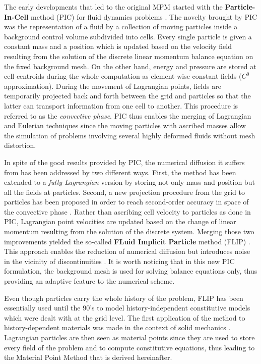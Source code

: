 The early developments that led to the original MPM started with the \textbf{Particle-In-Cell} method (PIC) for fluid dynamics problems \cite{PIC}.
The novelty brought by PIC was the representation of a fluid by a collection of moving particles inside a background control volume subdivided into cells.
Every single particle is given a constant mass and a position which is updated based on the velocity field resulting from the solution of the discrete linear momentum balance equation on the fixed background mesh. On the other hand, energy and pressure are stored at cell centroids during the whole computation as element-wise constant fields ($C^0$ approximation). 
During the movement of Lagrangian points, fields are temporarily projected back and forth between the grid and particles so that the latter can transport information from one cell to another.
This procedure is referred to as the \textit{convective phase}.
PIC thus enables the merging of Lagrangian and Eulerian techniques since the moving particles with ascribed masses allow the simulation of problems involving several highly deformed fluids without mesh distortion.

In spite of the good results provided by PIC, the numerical diffusion it suffers from has been addressed by two different ways.
First, the method has been extended to a \textit{fully Lagrangian} version \cite{McCrory_FLIP} by storing not only mass and position but all the fields at particles.
Second, a new projection procedure from the grid to particles has been proposed in order to reach second-order accuracy in space of the convective phase \cite{PIC_Nishiguchi}. 
Rather than ascribing cell velocity to particles as done in PIC, Lagrangian point velocities are updated based on the change of linear momentum resulting from the solution of the discrete system. 
Merging those two improvements yielded the so-called \textbf{FLuid Implicit Particle} method (FLIP) \cite{FLIP}.
This approach enables the reduction of numerical diffusion but introduces noise in the vicinity of discontinuities \cite{Mass_Flip}.
It is worth noticing that in this new PIC formulation, the background mesh is used for solving balance equations only, thus providing an adaptive feature to the numerical scheme. 


Even though particles carry the whole history of the problem, FLIP has been essentially used until the 90's to model history-independent constitutive models which were dealt with at the grid level. The first application of the method to history-dependent materials was made in the context of solid mechanics \cite{Sulsky94}. Lagrangian particles are then seen as material points since they are used to store every field of the problem and to compute constitutive equations, thus leading to the Material Point Method that is derived hereinafter. 

